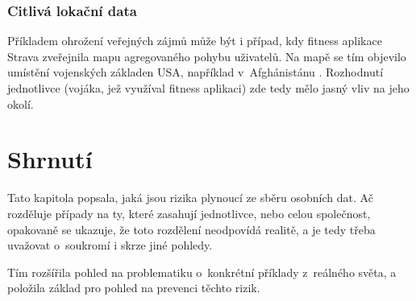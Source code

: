 \subsubsection*{Citlivá lokační data}
Příkladem ohrožení veřejných zájmů může být i případ, kdy fitness aplikace Strava zveřejnila mapu agregovaného pohybu uživatelů. Na mapě se tím objevilo umístění vojenských základen USA, například v~Afghánistánu \citep{strava-locations}. Rozhodnutí jednotlivce (vojáka, jež využíval fitness aplikaci) zde tedy mělo jasný vliv na jeho okolí.

\section*{Shrnutí}
Tato kapitola popsala, jaká jsou rizika plynoucí ze sběru osobních dat. Ač rozděluje případy na ty, které zasahují jednotlivce, nebo celou společnost, opakovaně se ukazuje, že toto rozdělení neodpovídá realitě, a je tedy třeba uvažovat o~soukromí i skrze jiné pohledy.

Tím rozšířila pohled na problematiku o~konkrétní příklady z~reálného světa, a položila základ pro pohled na prevenci těchto rizik.